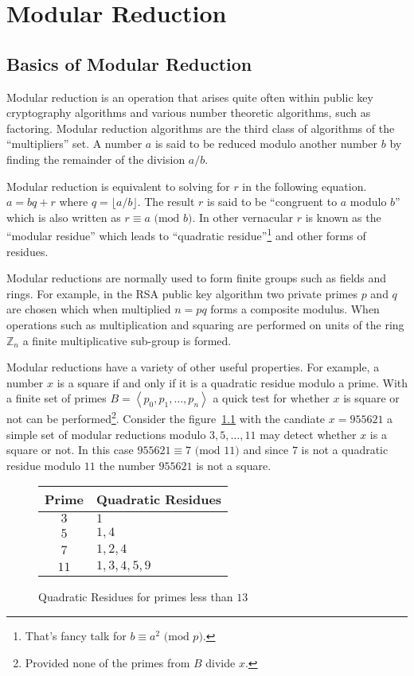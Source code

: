 \documentclass[b5paper]{book}
\def\Z{{\mathbb Z}}
\begin{document}
\chapter{Modular Reduction}
\section{Basics of Modular Reduction}
Modular reduction is an operation that arises quite often within public key cryptography algorithms and various number theoretic algorithms, 
such as factoring.  Modular reduction algorithms are the third class of algorithms of the ``multipliers'' set.  A number $a$ is said to be reduced 
modulo another number $b$ by finding the remainder of the division $a/b$.  

Modular reduction is equivalent to solving for $r$ in the following equation.  $a = bq + r$ where $q = \lfloor a/b \rfloor$.  The result 
$r$ is said to be ``congruent to $a$ modulo $b$'' which is also written as $r \equiv a \mbox{ (mod }b\mbox{)}$.  In other vernacular $r$ is known as the 
``modular residue'' which leads to ``quadratic residue''\footnote{That's fancy talk for $b \equiv a^2 \mbox{ (mod }p\mbox{)}$.} and
other forms of residues.  

Modular reductions are normally used to form finite groups such as fields and rings.  For example, in the RSA public key algorithm \cite{RSAPAPER} 
two private primes $p$ and $q$ are chosen which when multiplied $n = pq$ forms a composite modulus.  When operations such as multiplication and
squaring are performed on units of the ring $\Z_n$ a finite multiplicative sub-group is formed.

Modular reductions have a variety of other useful properties.  For example, a number $x$ is a square if and only if it is a quadratic
residue modulo a prime.  With a finite set of primes $B = \left < p_0, p_1, \ldots, p_n \right >$ a quick test for whether $x$ is square or not can 
be performed\footnote{Provided none of the primes from $B$ divide $x$.}.  Consider the figure~\ref{fig:QR} with the candiate $x = 955621$ a simple 
set of modular reductions modulo $3, 5, \ldots, 11$ may detect whether $x$ is a square or not.  In this case $955621 \equiv 7 \mbox{ (mod }11\mbox{)}$ 
and since $7$ is not a quadratic residue modulo $11$ the number $955621$ is not a square.  

\begin{figure}
\begin{center}
\begin{tabular}{|c|l|}
\hline \textbf{Prime} & \textbf{Quadratic Residues} \\
\hline $3$            & $1$ \\
\hline $5$            & $1, 4$ \\
\hline $7$            & $1, 2, 4$ \\
\hline $11$           & $1, 3, 4, 5, 9$ \\
\hline
\end{tabular}
\end{center}
\caption{Quadratic Residues for primes less than $13$}
\label{fig:QR}
\end{figure}
\end{document}
